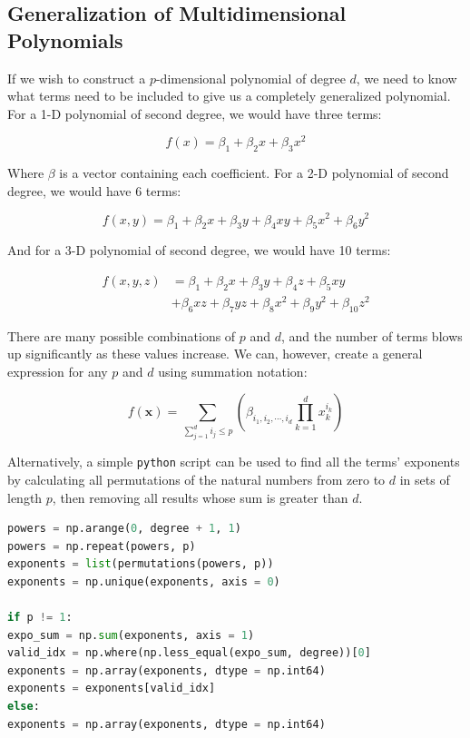 \documentclass[a4paper,10pt,english]{article}
\begin{document}
\subsection{Generalization of Multidimensional Polynomials}

If we wish to construct a $p$-dimensional polynomial of degree $d$, we need to know what terms need to be included to give us a completely generalized polynomial.  For a 1-D polynomial of second degree, we would have three terms:

\begin{equation*}
f(x) = \beta_1 + \beta_2 x + \beta_3 x^2
\end{equation*}

Where $\beta$ is a vector containing each coefficient.	For a 2-D polynomial of second degree, we would have 6 terms:

\begin{equation*}
f(x,y) = \beta_1 + \beta_2 x + \beta_3 y + \beta_4 xy + \beta_5 x^2 + \beta_6 y^2
\end{equation*}

And for a 3-D polynomial of second degree, we would have 10 terms:

\begin{align*}
f(x,y,z) &= \beta_1 + \beta_2 x + \beta_3 y + \beta_4 z + \beta_5 xy \\ &+ \beta_6 xz + \beta_7 yz + \beta_8 x^2 + \beta_9 y^2 + \beta_{10} z^2
\end{align*}

There are many possible combinations of $p$ and $d$, and the number of terms blows up significantly as these values increase.  We can, however, create a general expression \cite{2482654} for any $p$ and $d$ using summation notation:

\begin{equation}
\label{eq_method_0}
f(\mathbf{x}) = \sum_{\sum_{j = 1}^d i_j \leq p} \left( \beta_{i_1, i_2, \cdots, i_d} \prod_{k = 1}^d x_k^{i_k} \right)
\end{equation}

Alternatively, a simple \texttt{python} script can be used to find all the terms' exponents by calculating all permutations of the natural numbers from zero to $d$ in sets of length $p$, then removing all results whose sum is greater than $d$.

\begin{lstlisting}[showstringspaces=false,language=Python,firstnumber = 1]
powers = np.arange(0, degree + 1, 1)
powers = np.repeat(powers, p)
exponents = list(permutations(powers, p))
exponents = np.unique(exponents, axis = 0)

if p != 1:
expo_sum = np.sum(exponents, axis = 1)
valid_idx = np.where(np.less_equal(expo_sum, degree))[0]
exponents = np.array(exponents, dtype = np.int64)
exponents = exponents[valid_idx]
else:
exponents = np.array(exponents, dtype = np.int64)
\end{lstlisting}
\end{document}
